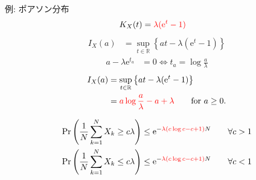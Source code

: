 \documentclass[lualatex,handout]{beamer}
\newcommand{\mycolor}[2]{%
  \begingroup
  \colorlet{currentcolor}{.}%
  \color{#1}#2%
  \color{currentcolor}%
  \endgroup
}
\newcommand{\emm}[1]{\mycolor{red}{#1}}
\theoremstyle{definition}
\begin{document}
\begin{frame}{例: ポアソン分布}
\begin{align*}
K_X(t) &= \emm{\lambda(\mathrm{e}^t-1)}
\end{align*}
\begin{align*}
I_X(a)&=\sup_{t\in\mathbb{R}}\left\{at - \lambda(\mathrm{e}^t-1)\right\}
\end{align*}
\begin{align*}
a-\lambda\mathrm{e}^{t_a} &= 0\iff t_a = \log \frac{a}{\lambda}
\end{align*}
\begin{align*}
I_X(a)&=\sup_{t\in\mathbb{R}}\left\{at - \lambda(\mathrm{e}^t-1)\right\}\\
 &= \emm{a\log\frac{a}{\lambda} -a + \lambda} \qquad\text{for } a \ge 0.
\end{align*}

\vspace{.5em}
\begin{align*}
\Pr\left(\frac1N\sum_{k=1}^N X_k \ge c\lambda\right) &\le \mathrm{e}^{-\emm{\lambda\left(c\log c -c + 1 \right)}N}\qquad\forall c > 1\\
\Pr\left(\frac1N\sum_{k=1}^N X_k \le c\lambda\right) &\le \mathrm{e}^{-\emm{\lambda\left(c\log c -c + 1 \right)}N}\qquad\forall c < 1\\
\end{align*}
\end{frame}
\end{document}
